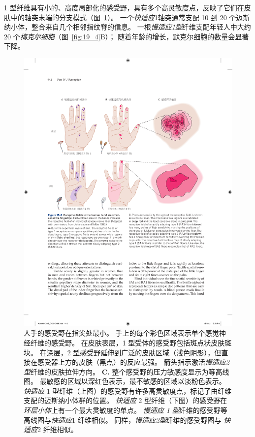 1 型纤维具有小的、高度局部化的感受野，具有多个高灵敏度点，反映了它们在皮肤中的轴突末端的分支模式（图~\ref{fig:19_5}）。
一个\textit{快适应}1轴突通常支配 10 到 20 个迈斯纳小体，整合来自几个相邻指纹脊的信息。
一根\textit{慢适应1型}纤维支配年轻人中大约 20 个\textit{梅克尔细胞}（图~\ref{fig:19_4}B）；
随着年龄的增长，默克尔细胞的数量会显著下降。


\begin{figure}[htbp]
	\centering
	\includegraphics[width=1.0\linewidth]{chap19/fig_19_5}
	\caption{人手的感受野在指尖处最小。
		手上的每个彩色区域表示单个感觉神经纤维的感受野\cite{johansson1983tactile}。
		在皮肤表层，1 型受体的感受野包括斑点状皮肤斑块。
		在深层，2 型感受野延伸到广泛的皮肤区域（浅色阴影），但直接在感受器上方的皮肤（黑点）的反应最强。 
		箭头指示激活\textit{慢适应2型}纤维的皮肤拉伸方向。
		\textbf{C.} 整个感受野的压力敏感度显示为等高线图。
		最敏感的区域以深红色表示，最不敏感的区域以淡粉色表示。
		\textit{快适应} 1 型纤维（上图）的感受野有许多高灵敏度点，标记了由纤维支配的迈斯纳小体群的位置。
		\textit{快适应} 2 型纤维（下图）的感受野在\textit{环层小体}上有一个最大灵敏度的单点。
		\textit{慢适应 1 型}纤维的感受野等高线图与\textit{快适应}1 纤维相似。
		同样，\textit{慢适应2型}纤维的感受野图与 \textit{快适应}2 纤维相似。}
	\label{fig:19_5}
\end{figure}


